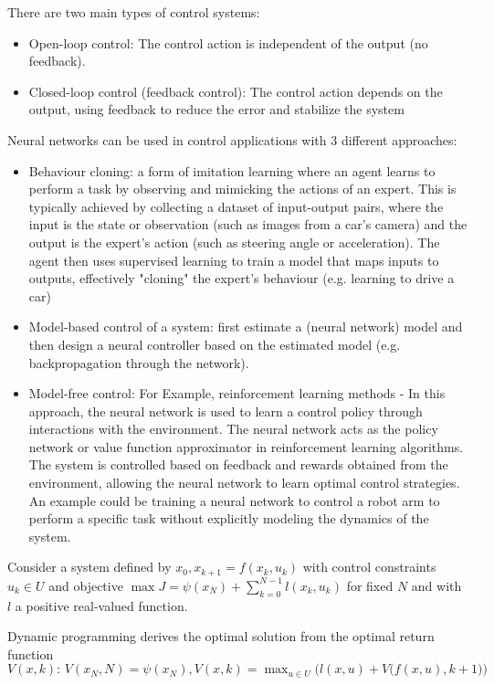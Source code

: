 There are two main types of control systems:

\begin{itemize}
    \item Open-loop control: The control action is independent of the output (no feedback).
    \item Closed-loop control (feedback control): The control action depends on the output,
    using feedback to reduce the error and stabilize the system
\end{itemize}

Neural networks can be used in control applications with 3 different approaches:

\begin{itemize}
    \item Behaviour cloning: a form of imitation learning where an agent learns to perform a task by observing and mimicking the actions of an expert. This is typically achieved by collecting a dataset of input-output pairs, where the input is the state or observation (such as images from a car's camera) and the output is the expert's action (such as steering angle or acceleration). The agent then uses supervised learning to train a model that maps inputs to outputs, effectively "cloning" the expert's behaviour (e.g. learning to drive a car)
    \item Model-based control of a system: first estimate a (neural network) model and then design a
    neural controller based on the estimated model (e.g. backpropagation through the network).
    \item Model-free control: For Example, reinforcement learning methods - In this approach, the neural network is used to learn a control
    policy through interactions with the environment. The neural network acts as the policy
    network or value function approximator in reinforcement learning algorithms. The system is
    controlled based on feedback and rewards obtained from the environment, allowing the
    neural network to learn optimal control strategies. An example could be training a neural
    network to control a robot arm to perform a specific task without explicitly modeling the
    dynamics of the system.
\end{itemize}

Consider a system defined by $x_0, x_{k+1} = f(x_k, u_k)$
with control constraints $u_k \in U$ and objective
$\max{J = \psi(x_N) + \sum_{k=0}^{N-1}{l(x_k, u_k)}}$ for fixed $N$ and with $l$ a positive real-valued function.

Dynamic programming derives the optimal solution from the optimal return function
$V(x, k) : \, V(x_N, N) = \psi(x_N), V(x, k) = \max_{u \in U}\big( l(x, u) + V \big( f(x, u), k + 1 \big) \big)$


